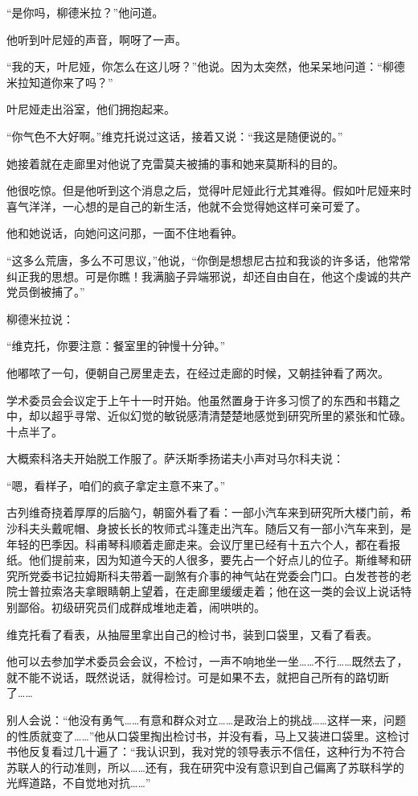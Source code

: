 “是你吗，柳德米拉？”他问道。

他听到叶尼娅的声音，啊呀了一声。

“我的天，叶尼娅，你怎么在这儿呀？”他说。因为太突然，他呆呆地问道：“柳德米拉知道你来了吗？”

叶尼娅走出浴室，他们拥抱起来。

“你气色不大好啊。”维克托说过这话，接着又说：“我这是随便说的。”

她接着就在走廊里对他说了克雷莫夫被捕的事和她来莫斯科的目的。

他很吃惊。但是他听到这个消息之后，觉得叶尼娅此行尤其难得。假如叶尼娅来时喜气洋洋，一心想的是自己的新生活，他就不会觉得她这样可亲可爱了。

他和她说话，向她问这问那，一面不住地看钟。

“这多么荒唐，多么不可思议，”他说，“你倒是想想尼古拉和我谈的许多话，他常常纠正我的思想。可是你瞧！我满脑子异端邪说，却还自由自在，他这个虔诚的共产党员倒被捕了。”

柳德米拉说：

“维克托，你要注意：餐室里的钟慢十分钟。”

他嘟哝了一句，便朝自己房里走去，在经过走廊的时候，又朝挂钟看了两次。

学术委员会会议定于上午十一时开始。他虽然置身于许多习惯了的东西和书籍之中，却以超乎寻常、近似幻觉的敏锐感清清楚楚地感觉到研究所里的紧张和忙碌。十点半了。

大概索科洛夫开始脱工作服了。萨沃斯季扬诺夫小声对马尔科夫说：

“嗯，看样子，咱们的疯子拿定主意不来了。”

古列维奇挠着厚厚的后脑勺，朝窗外看了看：一部小汽车来到研究所大楼门前，希沙科夫头戴呢帽、身披长长的牧师式斗篷走出汽车。随后又有一部小汽车来到，是年轻的巴季因。科甫琴科顺着走廊走来。会议厅里已经有十五六个人，都在看报纸。他们提前来，因为知道今天的人很多，要先占一个好点儿的位子。斯维琴和研究所党委书记拉姆斯科夫带着一副煞有介事的神气站在党委会门口。白发苍苍的老院士普拉索洛夫拿眼睛朝上望着，在走廊里缓缓走着；他在这一类的会议上说话特别鄙俗。初级研究员们成群成堆地走着，闹哄哄的。

维克托看了看表，从抽屉里拿出自己的检讨书，装到口袋里，又看了看表。

他可以去参加学术委员会会议，不检讨，一声不响地坐一坐……不行……既然去了，就不能不说话，既然说话，就得检讨。可是如果不去，就把自己所有的路切断了……

别人会说：“他没有勇气……有意和群众对立……是政治上的挑战……这样一来，问题的性质就变了……”他从口袋里掏出检讨书，并没有看，马上又装进口袋里。这检讨书他反复看过几十遍了：“我认识到，我对党的领导表示不信任，这种行为不符合苏联人的行动准则，所以……还有，我在研究中没有意识到自己偏离了苏联科学的光辉道路，不自觉地对抗……”

